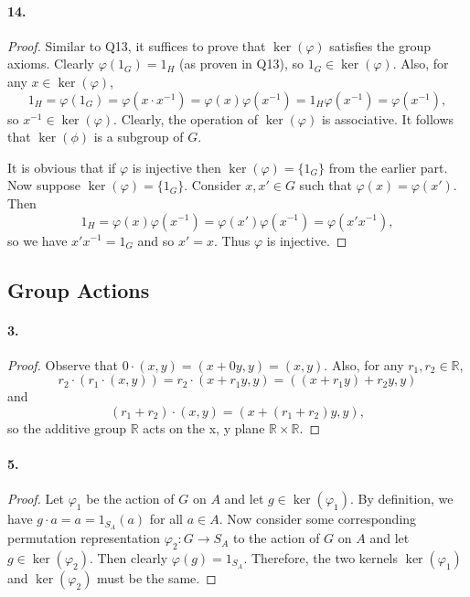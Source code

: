 \documentclass{article}
\begin{document}
\paragraph{14.}
\begin{proof}
  Similar to Q13, it suffices to prove that $\ker(\varphi)$ satisfies the group
  axioms. Clearly $\varphi(1_G) = 1_H$ (as proven in Q13), so $1_G \in
  \ker(\varphi)$. Also, for any $x \in \ker(\varphi)$, \[
    1_H = \varphi(1_G) = \varphi(x \cdot x^{-1}) = \varphi(x)\varphi(x^{-1}) =
    1_H\varphi(x^{-1}) = \varphi(x^{-1}),
  \] so $x^{-1} \in \ker(\varphi)$. Clearly, the operation of $\ker(\varphi)$
  is associative. It follows that $\ker(\phi)$ is a subgroup of $G$.

  It is obvious that if $\varphi$ is injective then $\ker(\varphi) = \{1_G\}$
  from the earlier part. Now suppose $\ker(\varphi) = \{1_G\}$. Consider $x, x'
  \in G$ such that $\varphi(x) = \varphi(x')$. Then \[
    1_H = \varphi(x)\varphi(x^{-1}) = \varphi(x')\varphi(x^{-1}) =
    \varphi(x'x^{-1}),
  \] so we have $x'x^{-1} = 1_G$ and so $x' = x$. Thus $\varphi$ is injective.
\end{proof}

\subsection{Group Actions}

\paragraph{3.}
\begin{proof}
  Observe that $0 \cdot (x, y) = (x + 0y, y) = (x, y)$. Also, for any $r_1, r_2
  \in \mathbb{R}$, \[
    r_2 \cdot (r_1 \cdot (x, y)) = r_2 \cdot (x + r_1y, y) =
    ((x + r_1y) + r_2y, y)
  \] and \[
    (r_1 + r_2) \cdot (x, y)  = (x + (r_1 + r_2)y, y),
  \] so the additive group $\mathbb{R}$ acts on the x, y plane $\mathbb{R}
  \times \mathbb{R}$.
\end{proof}

\paragraph{5.}
\begin{proof}
  Let $\varphi_1$ be the action of $G$ on $A$ and let $g \in \ker(\varphi_1)$.
  By definition, we have $g \cdot a = a = 1_{S_A}(a)$ for all $a \in A$.
  Now consider some corresponding permutation representation $\varphi_2: G \to
  S_A$ to the action of $G$ on $A$ and let $g \in \ker(\varphi_2)$. Then clearly
  $\varphi(g) = 1_{S_A}$. Therefore, the two kernels $\ker(\varphi_1)$ and
  $\ker(\varphi_2)$ must be the same.
\end{proof}
\end{document}
